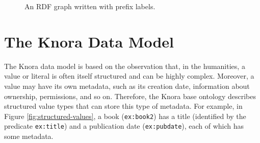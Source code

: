 \documentclass[12pt, a4paper]{article}
\begin{document}
\begin{figure}[h]
\centering


\caption{An RDF graph written with prefix labels.}
\label{fig:rdf-graph-with-prefix-labels}
\end{figure}

\section{The Knora Data Model}

\label{sec:data-model}

The Knora data model is based on the observation that, in the humanities, a value or literal is often itself structured and can be highly complex. Moreover, a value may have its own metadata, such as its creation date, information about ownership, permissions, and so on. Therefore, the Knora base ontology describes structured value types that can store this type of metadata. For example, in Figure \ref{fig:structured-values}, a book (\texttt{ex:book2}) has a title (identified by the predicate \texttt{ex:title}) and a publication date (\texttt{ex:pubdate}), each of which has some metadata.
\end{document}
